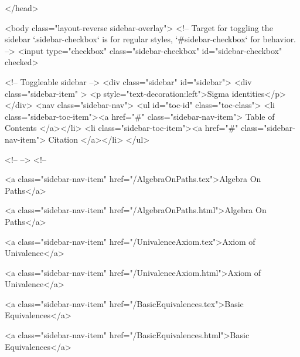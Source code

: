   
</head>




  <body class="layout-reverse sidebar-overlay">
    <!-- Target for toggling the sidebar `.sidebar-checkbox` is for regular
     styles, `#sidebar-checkbox` for behavior. -->
<input type="checkbox" class="sidebar-checkbox" id="sidebar-checkbox" checked>

<!-- Toggleable sidebar -->
<div class="sidebar" id="sidebar">
  <div class="sidebar-item" >
    <p style="text-decoration:left">Sigma identities</p>
  </div>
  <nav class="sidebar-nav">
    <ul id="toc-id" class="toc-class">
  <li class="sidebar-toc-item"><a href="#" class="sidebar-nav-item"> Table of Contents </a></li>
  <li class="sidebar-toc-item"><a href="#" class="sidebar-nav-item"> Citation </a></li>
</ul>


    <!--  -->
    <!-- 
      
    
      
    
      
    
      
    
      
        
      
    
      
        
          <a class="sidebar-nav-item" href="/AlgebraOnPaths.tex">Algebra On Paths</a>
        
      
    
      
        
          <a class="sidebar-nav-item" href="/AlgebraOnPaths.html">Algebra On Paths</a>
        
      
    
      
        
          <a class="sidebar-nav-item" href="/UnivalenceAxiom.tex">Axiom of Univalence</a>
        
      
    
      
        
          <a class="sidebar-nav-item" href="/UnivalenceAxiom.html">Axiom of Univalence</a>
        
      
    
      
        
          <a class="sidebar-nav-item" href="/BasicEquivalences.tex">Basic Equivalences</a>
        
      
    
      
        
          <a class="sidebar-nav-item" href="/BasicEquivalences.html">Basic Equivalences</a>
        

